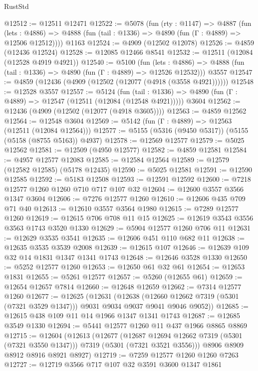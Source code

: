 \begin{lexlean}{RustStd}
\begin{coremodule}
@12512 := @12511 @12471
@12522 := @5078
    (fun (rty : @1147) =>
    @4887
      (fun (lets : @4886) =>
      @4888 (fun (tail : @1336) => @4890 (fun (Γ : @4889) => @12506 @12512))))
    @1163
@12524 := @4909 (@12502 @12078)
@12526 := @4859 (@12436 @12524)
@12528 := @12085 @12466 @8541
@12532 := @12511 (@12084 (@12528 @4919 @4921))
@12540 := @5100
    (fun (lets : @4886) => @4888 (fun (tail : @1336) => @4890 (fun (Γ : @4889) => @12526 @12532)))
    @3557
@12547 := @4859 (@12436 (@4909 (@12502 (@12077 (@4918 (@3558 @4921))))))
@12548 := @12528 @3557
@12557 := @5124
    (fun (tail : @1336) => @4890 (fun (Γ : @4889) => @12547 (@12511 (@12084 (@12548 @4921)))))
    @3604
@12562 := @12436 (@4909 (@12502 (@12077 (@4918 @3605))))
@12563 := @4859 @12562
@12564 := @12548 @3604
@12569 := @5142 (fun (Γ : @4889) => @12563 (@12511 (@12084 @12564)))
@12577 := @5155 (@5316 (@9450 @5317)) (@5155 (@5158 (@8755 @5163)) @4937)
@12578 := @12569 @12577
@12579 := @5025 @12562
@12581 := @12509 (@4950 @12577)
@12582 := @4859 @12581
@12584 := @4957 @12577 @12083
@12585 := @12584 @12564
@12589 := @12579 (@12582 @12585) (@5178 @12435)
@12590 := @5025 @12581
@12591 := @12590 @12585
@12592 := @5183 @12508
@12593 := @12591 @12592
@12600 := @7218 @12577 @1260 @1260 @710 @717 @107 @32
@12604 := @12600 @3557 @3566 @1347 @3604
@12606 := @7276 @12577 @1260
@12610 := @12606 @435 @709 @71 @40
@12613 := @12610 @3557 @3564 @1980
@12615 := @7289 @12577 @1260
@12619 := @12615 @706 @708 @11 @15
@12625 := @12619 @3543 @3556 @3563 @1743 @3520 @1330
@12629 := @5904 @12577 @1260 @706 @11
@12631 := @12629 @3535 @3541
@12635 := @12606 @451 @110 @682 @11
@12638 := @12635 @3535 @3539 @2008
@12639 := @12615 @107
@12646 := @12639 @109 @32 @14 @1831 @1347 @1341 @1743
@12648 := @12646 @3528 @1330
@12650 := @5252 @12577 @1260
@12653 := @12650 @61 @32 @61
@12654 := @12653 @1831
@12655 := @5261 @12577
@12657 := @5260 (@12655 @61)
@12659 := @12654 @12657 @7814
@12660 := @12648 @12659
@12662 := @7314 @12577 @1260
@12677 := @12625
    (@12631
      (@12638
        (@12660 @12662 @7319 (@5301 (@7321 @3529 @1347)))
        @9031
        @9034
        @9037
        @9041
        @9046
        @9052))
@12685 := @12615 @438 @109 @11 @14 @1966 @1347 @1341 @1743
@12687 := @12685 @3549 @1330
@12694 := @5441 @12577 @1260 @11 @437 @1966 @8865 @8869
@12715 := @12604
    (@12613
      (@12677
        (@12687 @12694 @12662 @7319 (@5301 (@7321 @3550 @1347)))
        @7319
        (@5301 (@7321 @3521 @3556)))
      @8906
      @8909
      @8912
      @8916
      @8921
      @8927)
@12719 := @7259 @12577 @1260 @1260 @7263
@12727 := @12719 @3566 @717 @107 @32 @3591 @3600 @1347 @1861

\end{coremodule}
\end{lexlean}
